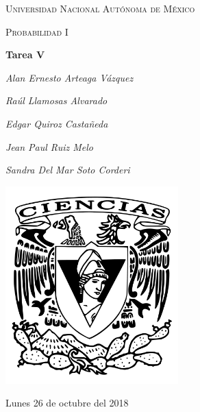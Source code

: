 \documentclass[12pt,a4paper]{report}
\begin{document}
	\begin{titlepage}
		\centering
		{\scshape\LARGE Universidad Nacional Autónoma de México \par}
		\vspace{1cm}
		{\scshape\Large Probabilidad I\par}
		\vspace{1.5cm}
		{\huge\bfseries Tarea V\par}
		\vspace{.5cm}

		{\Large\itshape Alan Ernesto Arteaga Vázquez \par}
		 \vspace{.5cm}
		{\Large\itshape Raúl Llamosas Alvarado \par}
		 \vspace{.5cm}
		{\Large\itshape Edgar Quiroz Castañeda \par}
	    \vspace{.5cm}
		{\Large\itshape Jean Paul Ruiz Melo\par}
		\vspace{.5cm}
		{\Large\itshape Sandra Del Mar Soto Corderi \par}

		\vfill
		 \includegraphics[width=0.5\textwidth]{escudo.png}
		\vfill

		{\large Lunes 26 de octubre del 2018 \par}
	\end{titlepage}

	\pagebreak
	\setlength{\voffset}{-0.75in}
	\setlength{\headsep}{5pt}
\end{document}
